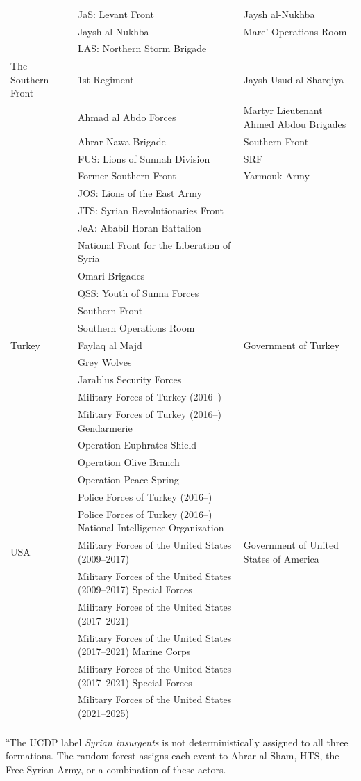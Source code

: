 \begin{longtable}{@{}>{\raggedright\arraybackslash}p{3.15cm} >{\raggedright\arraybackslash}p{6.15cm} >{\raggedright\arraybackslash}p{6.15cm}@{}}
 & JaS: Levant Front & Jaysh al-Nukhba \\
 & Jaysh al Nukhba & Mare' Operations Room \\
 & LAS: Northern Storm Brigade &  \\
\hline
The Southern Front & 1st Regiment & Jaysh Usud al-Sharqiya \\
 & Ahmad al Abdo Forces & Martyr Lieutenant Ahmed Abdou Brigades \\
 & Ahrar Nawa Brigade & Southern Front \\
 & FUS: Lions of Sunnah Division & SRF \\
 & Former Southern Front & Yarmouk Army \\
 & JOS: Lions of the East Army &  \\
 & JTS: Syrian Revolutionaries Front &  \\
 & JeA: Ababil Horan Battalion &  \\
 & National Front for the Liberation of Syria &  \\
 & Omari Brigades &  \\
 & QSS: Youth of Sunna Forces &  \\
 & Southern Front &  \\
 & Southern Operations Room &  \\
\hline
Turkey & Faylaq al Majd & Government of Turkey \\
 & Grey Wolves &  \\
 & Jarablus Security Forces &  \\
 & Military Forces of Turkey (2016--) &  \\
 & Military Forces of Turkey (2016--) Gendarmerie &  \\
 & Operation Euphrates Shield &  \\
 & Operation Olive Branch &  \\
 & Operation Peace Spring &  \\
 & Police Forces of Turkey (2016--) &  \\
 & Police Forces of Turkey (2016--) National Intelligence Organization &  \\
\hline
USA & Military Forces of the United States (2009--2017) & Government of United States of America \\
 & Military Forces of the United States (2009--2017) Special Forces &  \\
 & Military Forces of the United States (2017--2021) &  \\
 & Military Forces of the United States (2017--2021) Marine Corps &  \\
 & Military Forces of the United States (2017--2021) Special Forces &  \\
 & Military Forces of the United States (2021--2025) &  \\
\hline
\end{longtable}

\noindent\footnotesize
\textsuperscript{a}The UCDP label \emph{Syrian insurgents} is not deterministically assigned to all three formations. The random forest assigns each event to Ahrar al-Sham, HTS, the Free Syrian Army, or a combination of these actors.
\normalsize
\endgroup


